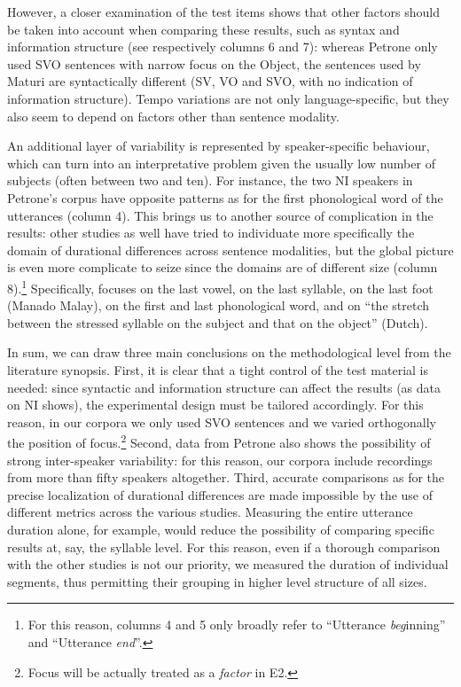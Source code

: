 However, a closer examination of the test items shows that other factors should be taken into account when comparing these results, such as syntax and information structure (see respectively columns 6 and 7): whereas Petrone only used SVO sentences with narrow focus on the Object, the sentences used by Maturi are syntactically different (SV, VO and SVO, with no indication of information structure). Tempo variations are not only language-specific, but they also seem to depend on factors other than sentence modality. 

An additional layer of variability is represented by speaker-specific behaviour, which can turn into an interpretative problem given the usually low number of subjects (often between two and ten). For instance, the two NI speakers in Petrone's corpus have opposite patterns as for the first phonological word of the utterances (column 4). This brings us to another source of complication in the results: other studies as well have tried to individuate more specifically the domain of durational differences across sentence modalities, but the global picture is even more complicate to seize since the domains are of different size (column 8).\footnote{For this reason, columns 4 and 5 only broadly refer to ``Utterance \textit{beg}inning'' and ``Utterance \textit{end}''.} Specifically, \citet{smith2002prosodic} focuses on the last vowel, \citet{ryalls1994effects} on the last syllable, \citet{vanheuven2005speech} on the last foot (Manado Malay), \citet{petrone2008role} on the first and last phonological word, and \citet{vanheuven2005speech} on ``the stretch between the stressed syllable on the subject and that on the object'' (Dutch). 

In sum, we can draw three main conclusions on the methodological level from the literature synopsis. First, it is clear that a tight control of the test material is needed: since syntactic and information structure can affect the results (as data on NI shows), the experimental design must be tailored accordingly. For this reason, in our corpora we only used SVO sentences and we varied orthogonally the position of focus.\footnote{Focus will be actually treated as a \textit{factor} in E2.} Second, data from Petrone also shows the possibility of strong inter-speaker variability: for this reason, our corpora include recordings from more than fifty speakers altogether. Third, accurate comparisons as for the precise localization of durational differences are made impossible by the use of different metrics across the various studies. Measuring the entire utterance duration alone, for example, would reduce the possibility of comparing specific results at, say, the syllable level. For this reason, even if a thorough comparison with the other studies is not our priority, we measured the duration of individual segments, thus permitting their grouping in higher level structure of all sizes.

